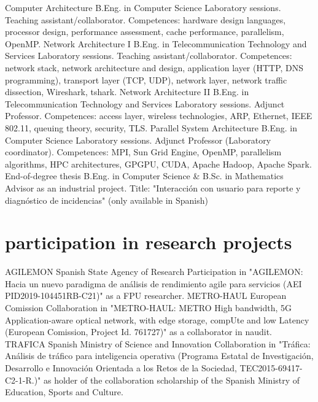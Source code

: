 \documentclass[]{friggeri-cv}
\begin{document}
\begin{entrylist}
{}
{Computer Architecture}
{B.Eng. in Computer Science}
{Laboratory sessions. Teaching assistant/collaborator. Competences: hardware design languages, processor design, performance assessment, cache performance, parallelism, OpenMP. %
}
{Network Architecture I}
{B.Eng. in Telecommunication Technology and Services}
{Laboratory sessions. Teaching assistant/collaborator. Competences: network stack, network architecture and design, application layer (HTTP, DNS programming), transport layer (TCP, UDP), network layer, network traffic dissection, Wireshark, tshark. %
}
{Network Architecture II}
{B.Eng. in Telecommunication Technology and Services}
{Laboratory sessions. Adjunct Professor. Competences: access layer, wireless technologies, ARP, Ethernet, IEEE 802.11, queuing theory, security, TLS. %
}
{Parallel System Architecture}
{B.Eng. in Computer Science}
{Laboratory sessions. Adjunct Professor (Laboratory coordinator). Competences: MPI, Sun Grid Engine, OpenMP, parallelism algorithms, HPC architectures, GPGPU, CUDA, Apache Hadoop, Apache Spark. %
}
{End-of-degree thesis}
{B.Eng. in Computer Science \& B.Sc. in Mathematics}
{Advisor as an industrial project. Title: "Interacción con usuario para reporte y diagnóstico de incidencias" (only available in Spanish)
}
\end{entrylist}

\section{participation in research projects}
\vspace{-1em}
\begin{entrylist}
{AGILEMON}
{Spanish State Agency of Research}
{Participation in "AGILEMON: Hacia un nuevo paradigma de análisis de rendimiento agile para servicios (AEI PID2019-104451RB-C21)" as a FPU researcher.
}
{METRO-HAUL}
{European Comission}
{Collaboration in "METRO-HAUL: METRO High bandwidth, 5G Application-aware optical network, with edge storage, compUte and low Latency (European Comission, Project Id. 761727)" as a collaborator in naudit.
}
{TRAFICA}
{Spanish Ministry of Science and Innovation}
{Collaboration in  "Tráfica: Análisis de tráfico para inteligencia operativa (Programa Estatal de Investigación, Desarrollo e Innovación Orientada a los Retos de la Sociedad, TEC2015-69417-C2-1-R.)" as holder of the collaboration scholarship of the Spanish Ministry of Education, Sports and Culture.
}
\end{entrylist}
\vspace{-2em}
\end{document}
